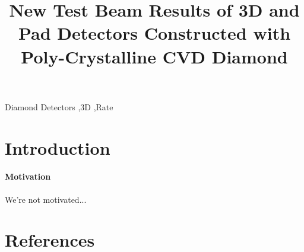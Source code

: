 \documentclass[review]{elsarticle}
\title{New Test Beam Results of 3D and Pad Detectors Constructed with Poly-Crystalline CVD Diamond}
\begin{document}
\begin{frontmatter}

	
	
	
	\begin{keyword}
	Diamond Detectors \sep 3D \sep Rate
	\end{keyword}

\end{frontmatter}

\linenumbers

\section{Introduction}

\paragraph{Motivation} We're not motivated...

\section*{References}

\end{document}
